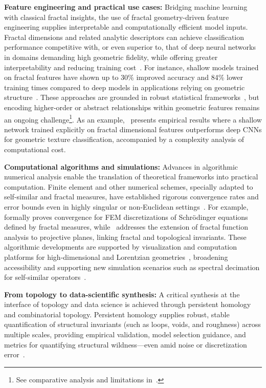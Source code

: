 \documentclass[sigconf]{acmart}
\begin{document}
\textbf{Feature engineering and practical use cases:}
Bridging machine learning with classical fractal insights, the use of fractal geometry-driven feature engineering supplies interpretable and computationally efficient model inputs. Fractal dimensions and related analytic descriptors can achieve classification performance competitive with, or even superior to, that of deep neural networks in domains demanding high geometric fidelity, while offering greater interpretability and reducing training cost~\cite{ref26,ref39}. For instance, shallow models trained on fractal features have shown up to 30\% improved accuracy and 84\% lower training times compared to deep models in applications relying on geometric structure~\cite{ref39}. These approaches are grounded in robust statistical frameworks~\cite{ref30}, but encoding higher-order or abstract relationships within geometric features remains an ongoing challenge\footnote{See comparative analysis and limitations in~\cite{ref39}.}. As an example,~\cite{ref39} presents empirical results where a shallow network trained explicitly on fractal dimensional features outperforms deep CNNs for geometric texture classification, accompanied by a complexity analysis of computational cost.

\textbf{Computational algorithms and simulations:}
Advances in algorithmic numerical analysis enable the translation of theoretical frameworks into practical computation. Finite element and other numerical schemes, specially adapted to self-similar and fractal measures, have established rigorous convergence rates and error bounds even in highly singular or non-Euclidean settings~\cite{ref29,ref31,ref32,ref33,ref45}. For example, \cite{ref29} formally proves convergence for FEM discretizations of Schrödinger equations defined by fractal measures, while~\cite{ref33} addresses the extension of fractal function analysis to projective planes, linking fractal and topological invariants. These algorithmic developments are supported by visualization and computation platforms for high-dimensional and Lorentzian geometries~\cite{ref45,ref54}, broadening accessibility and supporting new simulation scenarios such as spectral decimation for self-similar operators~\cite{ref54}.

\textbf{From topology to data-scientific synthesis:}
A critical synthesis at the interface of topology and data science is achieved through persistent homology and combinatorial topology. Persistent homology supplies robust, stable quantification of structural invariants (such as loops, voids, and roughness) across multiple scales, providing empirical validation, model selection guidance, and metrics for quantifying structural wildness—even amid noise or discretization error~\cite{ref39}.
\end{document}
